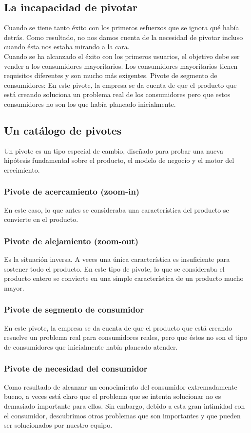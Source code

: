 \documentclass[10pt]{article}
\begin{document}
\begin{multicols}{2}
\subsection*{La incapacidad de pivotar}
Cuando se tiene tanto éxito con los primeros esfuerzos que se ignora qué había detrás. Como resultado, no nos damos cuenta de la necesidad de pivotar incluso cuando ésta nos estaba mirando a la cara.\\
 Cuando se ha alcanzado el éxito con los primeros usuarios, el objetivo debe ser vender a los consumidores mayoritarios. Los consumidores mayoritarios tienen requisitos diferentes y son mucho más exigentes.
{\color{red}Pivote de segmento de consumidores: En este pivote, la empresa se da cuenta de que el producto que está creando soluciona un problema real de los consumidores pero que estos consumidores no son los que había planeado inicialmente.}
\subsection*{Un catálogo de pivotes}
{\color{blue}Un pivote es un tipo especial de cambio, diseñado para probar una nueva hipótesis fundamental sobre el producto, el modelo de negocio y el motor del crecimiento.}
\subsubsection*{Pivote de acercamiento (zoom-in)}
En este caso, lo que antes se consideraba una característica del producto se convierte en el producto. 
\subsubsection*{Pivote de alejamiento (zoom-out)}
Es la situación inversa. A veces una única característica es insuficiente para sostener todo el producto. En este tipo de pivote, lo que se consideraba el producto entero se convierte en una simple característica de un producto mucho mayor.
\subsubsection*{Pivote de segmento de consumidor}
En este pivote, la empresa se da cuenta de que el producto que está creando resuelve un problema real para consumidores reales, pero que éstos no son el tipo de consumidores que inicialmente había planeado atender.
\subsubsection*{Pivote de necesidad del consumidor}
Como resultado de alcanzar un conocimiento del consumidor extremadamente bueno, a veces está claro que el problema que se intenta solucionar no es demasiado importante para ellos. Sin embargo, debido a esta gran intimidad con el consumidor, descubrimos otros problemas que son importantes y que pueden ser solucionados por nuestro equipo.

\end{multicols}
\end{document}
